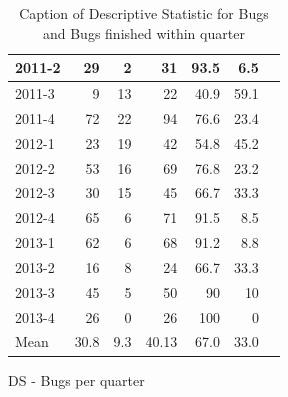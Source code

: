 \documentclass[UKenglish]{ifimaster}  %
\begin{document}
\begin{appendices}
\begin{table}[!htbp]
\begin{adjustwidth}{-2cm}{}
\begin{subfigure}[b]{0.4\textwidth}
{\begin{tabular}{ | l | r | r | r | r | r | r | }
2011-2 & 29 & 2 & 31 & 93.5 & 6.5 \\ \hline
2011-3 & 9 & 13 & 22 & 40.9 & 59.1 \\ \hline
2011-4 & 72 & 22 & 94 & 76.6& 23.4 \\ \hline
2012-1 & 23 & 19 & 42 & 54.8 & 45.2 \\ \hline
2012-2 & 53 & 16 & 69 & 76.8 & 23.2 \\ \hline
2012-3 & 30 & 15 & 45 & 66.7 & 33.3\\ \hline
2012-4 & 65 & 6 & 71 & 91.5 & 8.5 \\ \hline
2013-1 & 62 & 6 & 68 & 91.2 & 8.8 \\ \hline
2013-2 & 16 & 8 & 24 & 66.7 & 33.3 \\ \hline
2013-3 & 45 & 5 & 50 & 90 & 10 \\ \hline
2013-4 & 26 & 0 & 26 & 100 & 0 \\ \hline
Mean & 30.8&9.3&40.13&67.0&33.0 \\ \hline

\end{tabular}
}
\caption{DS - Bugs per quarter}
 \label{DS:FTPQ:10}
\end{subfigure}
\end{adjustwidth}
\caption[Optional caption for list of figures]{Caption of Descriptive Statistic for Bugs and Bugs finished within quarter}
\label{DS:10:5} %
\end{table}

\end{appendices}
 
\backmatter{}
\printbibliography
\end{document}
